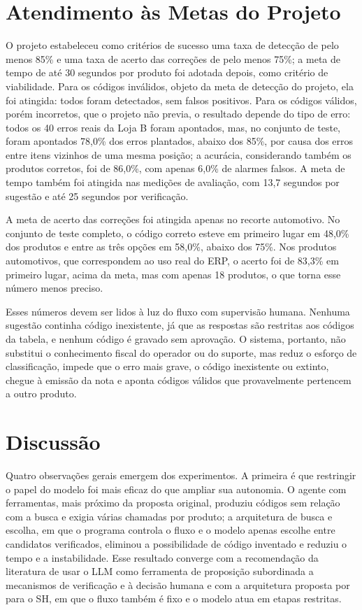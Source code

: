 \section{Atendimento às Metas do Projeto}

O projeto estabeleceu como critérios de sucesso uma taxa de detecção de pelo menos 85\% e uma taxa de acerto das correções de pelo menos 75\%; a meta de tempo de até 30 segundos por produto foi adotada depois, como critério de viabilidade. Para os códigos inválidos, objeto da meta de detecção do projeto, ela foi atingida: todos foram detectados, sem falsos positivos. Para os códigos válidos, porém incorretos, que o projeto não previa, o resultado depende do tipo de erro: todos os 40 erros reais da Loja B foram apontados, mas, no conjunto de teste, foram apontados 78,0\% dos erros plantados, abaixo dos 85\%, por causa dos erros entre itens vizinhos de uma mesma posição; a acurácia, considerando também os produtos corretos, foi de 86,0\%, com apenas 6,0\% de alarmes falsos. A meta de tempo também foi atingida nas medições de avaliação, com 13,7 segundos por sugestão e até 25 segundos por verificação.

A meta de acerto das correções foi atingida apenas no recorte automotivo. No conjunto de teste completo, o código correto esteve em primeiro lugar em 48,0\% dos produtos e entre as três opções em 58,0\%, abaixo dos 75\%. Nos produtos automotivos, que correspondem ao uso real do ERP, o acerto foi de 83,3\% em primeiro lugar, acima da meta, mas com apenas 18 produtos, o que torna esse número menos preciso.

Esses números devem ser lidos à luz do fluxo com supervisão humana. Nenhuma sugestão continha código inexistente, já que as respostas são restritas aos códigos da tabela, e nenhum código é gravado sem aprovação. O sistema, portanto, não substitui o conhecimento fiscal do operador ou do suporte, mas reduz o esforço de classificação, impede que o erro mais grave, o código inexistente ou extinto, chegue à emissão da nota e aponta códigos válidos que provavelmente pertencem a outro produto.

\section{Discussão}

Quatro observações gerais emergem dos experimentos. A primeira é que restringir o papel do modelo foi mais eficaz do que ampliar sua autonomia. O agente com ferramentas, mais próximo da proposta original, produziu códigos sem relação com a busca e exigia várias chamadas por produto; a arquitetura de busca e escolha, em que o programa controla o fluxo e o modelo apenas escolhe entre candidatos verificados, eliminou a possibilidade de código inventado e reduziu o tempo e a instabilidade. Esse resultado converge com a recomendação da literatura de usar o LLM como ferramenta de proposição subordinada a mecanismos de verificação e à decisão humana \cite{Natarajan2024AI2L,huang2025hallucination} e com a arquitetura proposta por  para o SH, em que o fluxo também é fixo e o modelo atua em etapas restritas.

